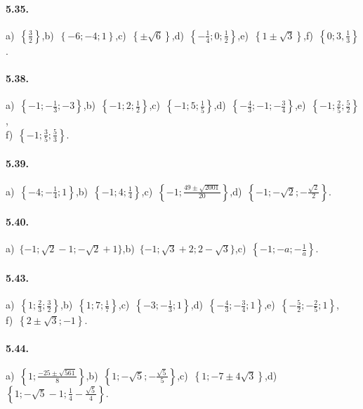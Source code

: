 \paragraph{5.35.} a)~$\left\{\frac 3 2\right\}$,\quad b)~$\left\{-6;-4;1\right\}$,\quad c)~$\left\{\pm\sqrt 6\right\}$,\quad d)~$\left\{-\frac 1 4;0;\frac 1 2\right\}$,\quad e)~$\left\{1\pm \sqrt 3\right\}$,\quad f)~$\left\{0;3,\frac 1 3\right\}$.

\paragraph{5.38.} a)~$\left\{-1;-\frac 1 3;-3\right\}$,\quad b)~$\left\{-1;2;\frac 1 2 \right\}$,\quad c)~$\left\{-1;5;\frac 1 5\right\}$,\quad d)~$\left\{-\frac 4 3;-1;-\frac 3 4\right\}$,\quad e)~$\left\{-1;\frac 2 5;\frac 5 2\right\}$,\protect \\
f)~$\left\{-1;\frac 3 5;\frac 5 3\right\}$.

\paragraph{5.39.} a)~$\left\{-4;-\frac 1 4;1\right\}$,\quad b)~$\left\{-1;4;\frac 1 4\right\}$,\quad c)~$\left\{-1;\frac{49\pm \sqrt{2001}}{20}\right\}$,\quad d)~$\left\{-1;-\sqrt 2;-\frac{\sqrt 2} 2\right\}$.

\paragraph{5.40.} a)~$\{-1;\sqrt 2-1;-\sqrt 2+1\}$,\quad b)~$\{-1;\sqrt 3+2;2-\sqrt 3\}$,\quad c)~$\left\{-1;-a;-\frac 1 a\right\}$.

\paragraph{5.43.} a)~$\left\{1;\frac 2 3;\frac 3 2\right\}$,\quad b)~$\left\{1;7;\frac 1 7\right\}$,\quad c)~$\left\{-3;-\frac 1 3;1\right\}$,\quad d)~$\left\{-\frac 4 3;-\frac 3 4;1\right\}$,\quad e)~$\left\{-\frac 5 2;-\frac 2 5;1\right\}$,\protect\\ f)~$\left\{2\pm\sqrt 3;-1\right\}$.

\paragraph{5.44.} a)~$\left\{1;\frac{-25\pm \sqrt{561}} 8\right\}$,\quad b)~$\left\{1;-\sqrt 5;-\frac{\sqrt 5} 5\right\}$,\quad c)~$\left\{1;-7\pm 4\sqrt 3\right\}$,\quad d)~$\left\{1;-\sqrt 5-1;\frac 1 4-\frac{\sqrt 5} 4\right\}$.


